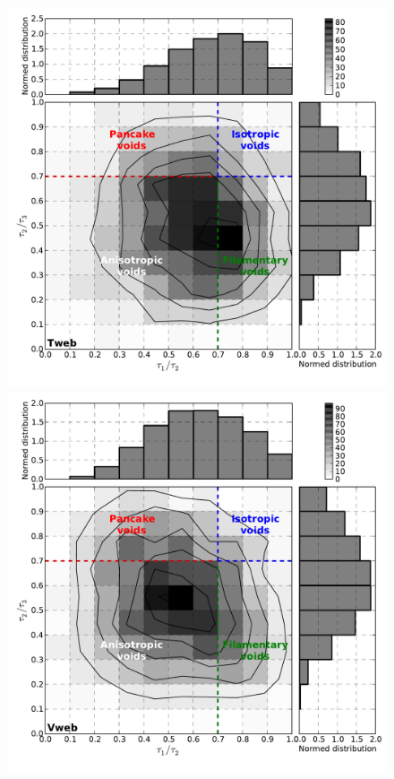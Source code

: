 \documentclass[usenatbib]{latex/mn2e}
\begin{document}
\begin{flushleft}
\begin{figure}
\begin{center}
  \includegraphics[trim = 7mm 9mm 1mm 0mm, clip, keepaspectratio=true,
  width=0.36\textheight]{./figures/voids_inertia_tensor_Tweb}
  \includegraphics[trim = 7mm 9mm 1mm 0mm, clip, keepaspectratio=true,
  width=0.36\textheight]{./figures/voids_inertia_tensor_Vweb}


  \label{fig:distro_inertia}
  \vspace{0.1 cm}

\end{center}
\end{figure}
\end{flushleft}
\end{document}
